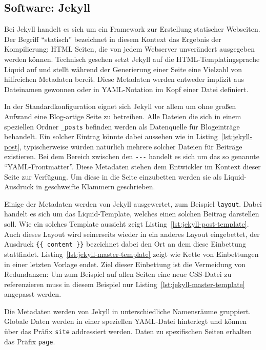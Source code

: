 \subsection{Software: Jekyll}
\label{sec:software-jekyll}
Bei Jekyll handelt es sich um ein Framework zur Erstellung statischer Webseiten. Der Begriff "`statisch"' bezeichnet in diesem Kontext das Ergebnis der Kompilierung: HTML Seiten, die von jedem Webserver unverändert ausgegeben werden können. Technisch gesehen setzt Jekyll auf die HTML-Templatingsprache Liquid auf und stellt während der Generierung einer Seite eine Vielzahl von hilfreichen Metadaten bereit. Diese Metadaten werden entweder implizit aus Dateinamen gewonnen oder in YAML-Notation im Kopf einer Datei definiert.

In der Standardkonfiguration eignet sich Jekyll vor allem um ohne großen Aufwand eine Blog-artige Seite zu betreiben. Alle Dateien die sich in einem speziellen Ordner \lstinline{_posts} befinden werden als Datenquelle für Blogeinträge behandelt. Ein solcher Eintrag könnte dabei aussehen wie in Listing~\ref{lst:jekyll-post}, typischerweise würden natürlich mehrere solcher Dateien für Beiträge existieren. Bei dem Bereich zwischen den \lstinline{---} handelt es sich um das so genannte "`YAML-Frontmatter"'. Diese Metadaten stehen dem Entwickler im Kontext dieser Seite zur Verfügung. Um diese in die Seite einzubetten werden sie als Liquid-Ausdruck in geschweifte Klammern geschrieben.

Einige der Metadaten werden von Jekyll ausgewertet, zum Beispiel \lstinline{layout}. Dabei handelt es sich um das Liquid-Template, welches einen solchen Beitrag darstellen soll. Wie ein solches Template aussieht zeigt Listing~\ref{lst:jekyll-post-template}. Auch dieses Layout wird seinerseits wieder in ein anderes Layout eingebettet, der Ausdruck \lstinline|{{ content }}| bezeichnet dabei den Ort an dem diese Einbettung stattfindet. Listing~\ref{lst:jekyll-master-template} zeigt wie Kette von Einbettungen in einer letzten Vorlage endet. Ziel dieser Einbettung ist die Vermeidung von Redundanzen: Um zum Beispiel auf allen Seiten eine neue CSS-Datei zu referenzieren muss in diesem Beispiel nur Listing~\ref{lst:jekyll-master-template} angepasst werden.

Die Metadaten werden von Jekyll in unterschiedliche Namensräume gruppiert. Globale Daten werden in einer speziellen YAML-Datei hinterlegt und können über das Präfix \lstinline{site} addressiert werden. Daten zu spezifischen Seiten erhalten das Präfix \lstinline{page}.

